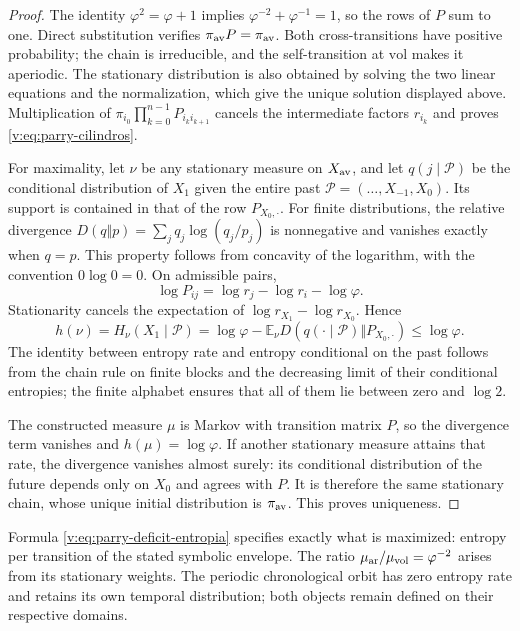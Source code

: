 \begin{proof}
The identity \(\varphi^2=\varphi+1\) implies
\(\varphi^{-2}+\varphi^{-1}=1\), so the rows of \(P\)
sum to one. Direct substitution verifies
\(\pi_{\rm av}P=\pi_{\rm av}\). Both cross-transitions
have positive probability; the chain is irreducible, and the self-transition
at \(\mathrm{vol}\) makes it aperiodic. The stationary distribution
is also obtained by solving the two linear equations and the
normalization, which give the unique solution displayed above. Multiplication of
\(\pi_{i_0}\prod_{k=0}^{n-1}P_{i_k i_{k+1}}\) cancels the intermediate
factors \(r_{i_k}\) and proves \eqref{v:eq:parry-cilindros}.

For maximality, let \(\nu\) be any stationary measure
on \(X_{\rm av}\), and let
\(q(j\mid\mathcal P)\) be the conditional distribution of \(X_1\)
given the entire past \(\mathcal P=(\ldots,X_{-1},X_0)\).
Its support is contained in that of the row \(P_{X_0,\cdot}\).
For finite distributions, the relative divergence
\(D(q\Vert p)=\sum_jq_j\log(q_j/p_j)\) is nonnegative and
vanishes exactly when \(q=p\). This property follows from
concavity of the logarithm, with the convention \(0\log0=0\).
On admissible pairs,
\[
 \log P_{ij}=\log r_j-\log r_i-\log\varphi.
\]
Stationarity cancels the expectation of
\(\log r_{X_1}-\log r_{X_0}\). Hence
\begin{equation}
 h(\nu)=H_\nu(X_1\mid\mathcal P)
 =\log\varphi-
 \mathbb E_\nu D\!\left(q(\cdot\mid\mathcal P)
                  \Vert P_{X_0,\cdot}\right)
 \leq\log\varphi.
 \label{v:eq:parry-deficit-entropia}
\end{equation}
The identity between entropy rate and entropy conditional on the past follows
from the chain rule on finite blocks and the decreasing limit
of their conditional entropies; the finite alphabet ensures
that all of them lie between zero and \(\log2\).

The constructed measure \(\mu\) is Markov with transition matrix \(P\),
so the divergence term vanishes and
\(h(\mu)=\log\varphi\). If another stationary measure attains
that rate, the divergence vanishes almost surely: its conditional
distribution of the future depends only on \(X_0\) and agrees with \(P\).
It is therefore the same stationary chain, whose unique initial
distribution is \(\pi_{\rm av}\). This proves uniqueness.
\end{proof}

Formula \eqref{v:eq:parry-deficit-entropia} specifies exactly what is maximized:
entropy per transition of the stated symbolic envelope. The ratio
\(\mu_{\rm ar}/\mu_{\rm vol}=\varphi^{-2}\) arises from its stationary
weights. The periodic chronological orbit has zero entropy
rate and retains its own temporal distribution; both objects remain
defined on their respective domains.
